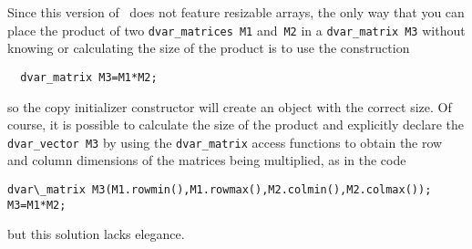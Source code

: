 \documentclass{admbmanual}
\begin{document}
% 

Since this version of \scAD\ does not feature resizable arrays,
the only way that you can place the product of two 
\texttt{dvar\_matrices}~\texttt{M1} and~\texttt{M2} in a \texttt{dvar\_matrix}~\texttt{M3}
 without knowing or 
calculating the size of the product is to use the construction
\begin{lstlisting}
  dvar_matrix M3=M1*M2;
\end{lstlisting}
so the copy initializer constructor will create 
an object with the correct size. Of course, it is possible to calculate the 
size of the product and explicitly declare the \texttt{dvar\_vector~M3}
by using the \texttt{dvar\_matrix} access functions to obtain the
row and column dimensions of the matrices being multiplied, as in the code
\begin{lstlisting}
dvar\_matrix M3(M1.rowmin(),M1.rowmax(),M2.colmin(),M2.colmax());
M3=M1*M2;
\end{lstlisting}
but this solution lacks elegance.
\end{document}
